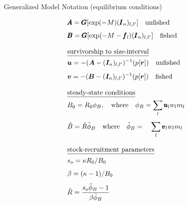 \documentclass[final]{beamer} %
\begin{document}
\begin{frame}{}
\begin{columns}[t]
\begin{column}{.3\linewidth}
\begin{block}{\large Generalized Model Notation (equilibrium conditions)}
\begin{table}
\begin{align}
                &\pmb{A} = \pmb{G} [\exp(-M) (\pmb{I}_n)_{l,l'}] \quad \mbox{unfished}\label{T1.10}\\[1ex]
                &\pmb{B} = \pmb{G} [\exp(-M - \pmb{f}_{l}) (\pmb{I}_n)_{l,l'}] \quad \mbox{fished} \label{T1.12}\\[2ex]
                &\mbox{\underline{survivorship to size-interval}} \nonumber \\
                & \bm{u}   = -(\bm{A} - (\bm{I}_n)_{l,l'})^{-1} (p[\bm{r}]) \quad \mbox{unfished} \label{T1.13a}\\[1ex]
                & \bm{v}   = -(\bm{B} - (\bm{I}_n)_{l,l'})^{-1} (p[\bm{r}]) \quad \mbox{fished}   \label{T1.13b}\\[2ex]
                &\mbox{\underline{steady-state conditions}}\nonumber \\
                & B_0 = R_0 \phi_B, \quad\mbox{where} \quad \phi_B=  \sum_l \pmb{u}_{l} w_{l} m_{l} \label{T1.14}\\[1ex]
                & \tilde{B} = \tilde{R} \tilde{\phi}_B \quad\mbox{where}\quad \tilde{\phi}_B= \quad \sum_l \pmb{v}_{l} w_{l} m_{l} \label{T1.16}\\[2ex]
                &\mbox{\underline{stock-recruitment parameters}}\nonumber\\
                &s_o = \kappa R_0 / B_0 \label{T1.17}\\[1ex]
                &\beta = (\kappa -1)/B_0 \label{T1.18}\\[1ex]
                &\tilde{R} = \frac{s_o \tilde{\phi}_B -1}{\beta \tilde{\phi}_B} \label{T1.19}
              \end{align}
            \end{table}
        \end{block}


\end{column}
\end{columns}
\end{frame}
\end{document}
